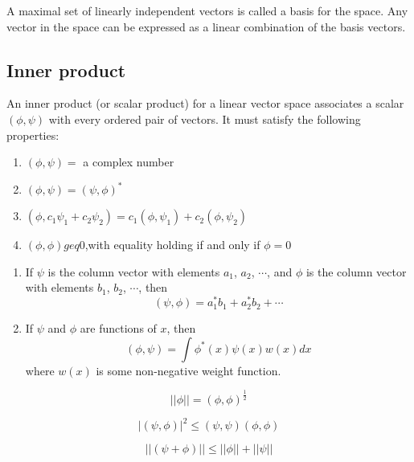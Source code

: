 \begin{newdef}[Base]
A maximal set of linearly independent vectors is called a basis for the space. Any vector in the space can be expressed as a linear combination of the basis vectors.
\end{newdef}

\subsection{Inner product}
\begin{newdef}
An inner product (or scalar product) for a linear vector space associates a scalar $(\phi,\psi)$ with every ordered pair of vectors. 
It must satisfy the following properties:
\begin{enumerate}
\item $(\phi,\psi) = $ a complex number
\item $(\phi,\psi) = (\psi,\phi)^*$
\item $(\phi,c_1\psi_1 + c_2\psi_2) = c_1(\phi,\psi_1) + c_2(\phi,\psi_2)$
\item $(\phi,\phi) geq 0$,with equality holding if and only if $\phi=0$
\end{enumerate}
\end{newdef}

\begin{example}
\begin{enumerate}
\item If $\psi$ is the column vector with elements $a_1$, $a_2$, $\cdots$, and $\phi$ is the column vector with elements $b_1$, $b_2$, $\cdots$, then
\[(\psi,\phi) = a_1^*b_1 + a_2^*b_2 + \cdots\]
\item If $\psi$ and $\phi$ are functions of $x$, then
\[(\phi,\psi) = \int \phi^*(x) \psi(x) w(x) dx\]
where $w(x)$ is some non-negative weight function.
\end{enumerate}
\end{example}

\begin{newdef}[Norm]
\[|| \phi || = (\phi,\phi)^{\frac{1}{2}}\]
\end{newdef}

\begin{newthem}
\[|(\psi,\phi)|^2 \leq (\psi,\psi)(\phi,\phi)\]
\end{newthem}

\begin{newthem}
\[||(\psi+\phi)|| \leq ||\phi|| + ||\psi||\]
\end{newthem}

